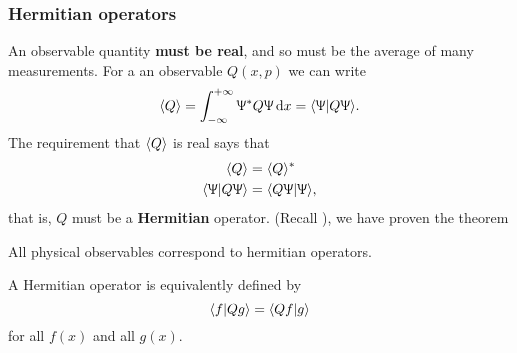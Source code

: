 \subsubsection{Hermitian operators}
An observable quantity \textbf{must be real}, and so must be the average of many measurements. 
For a an observable $Q(x,p)$ we can write
\begin{equation}
\lgl Q\rgl=\intinf\ups^*Q\ups\dx=\lgl \ups|Q\ups\rgl.
\end{equation}
The requirement that $\langle Q\rangle$ is real says that
\begin{subequations}
\begin{align}
\langle Q\rangle&=\langle Q\rangle^*\\
\langle \Uppsi|Q\Uppsi\rangle&=\langle Q\Uppsi|\Uppsi\rangle, 
\end{align}
\end{subequations}
that is, $Q$ must be a \textbf{Hermitian} operator. (Recall ), 
we have proven the theorem
\begin{thrm}
\label{obs_herm}
All physical observables correspond to hermitian operators. 
\end{thrm}
\begin{lemma}
A Hermitian operator is equivalently defined by
\begin{equation}
\langle f|Qg\rangle=\langle Qf|g\rangle
\end{equation}
for all $f(x)$ and all $g(x)$. 
\end{lemma}
